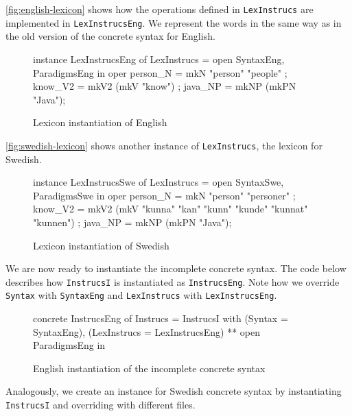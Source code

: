 \autoref{fig:english-lexicon} shows how the operations defined in \texttt{LexInstrucs} are implemented in \texttt{LexInstrucsEng}. We represent the words in the same  way as in the old version of the concrete syntax for English.

\begin{figure}[H]
\begin{code}
instance LexInstrucsEng of LexInstrucs = open SyntaxEng, ParadigmsEng in {
    oper
      person_N = mkN "person" "people" ;
      know_V2 = mkV2 (mkV "know") ;	  
      java_NP = mkNP (mkPN "Java");
}
\end{code}
\caption{Lexicon instantiation of English \label{fig:english-lexicon}}
\end{figure}

\autoref{fig:swedish-lexicon} shows another instance of \texttt{LexInstrucs}, the lexicon for Swedish. 

\begin{figure}[H]
\begin{code}
instance LexInstrucsSwe of LexInstrucs = open SyntaxSwe, ParadigmsSwe in {
    oper
      person_N = mkN "person" "personer" ;
      know_V2 = mkV2 (mkV "kunna" "kan" "kunn" "kunde" "kunnat" "kunnen") ;	  
      java_NP = mkNP (mkPN "Java");
}
\end{code}
\caption{Lexicon instantiation of Swedish\label{fig:swedish-lexicon}}
\end{figure}

We are now ready to instantiate the incomplete concrete syntax. The code below describes how \texttt{InstrucsI} is instantiated as \texttt{InstrucsEng}. Note how we override \texttt{Syntax} with \texttt{SyntaxEng} and \texttt{LexInstrucs} with \texttt{LexInstrucsEng}.

\begin{figure}[H]
\begin{code}
concrete InstrucsEng of Instrucs = InstrucsI with 
                                         (Syntax = SyntaxEng), 
                                         (LexInstrucs = LexInstrucsEng) 
                                         ** open ParadigmsEng in {}
\end{code}
\caption{English instantiation of the incomplete concrete syntax}
\end{figure}

Analogously, we create an instance for Swedish concrete syntax by instantiating \texttt{InstrucsI} and overriding with different files.

